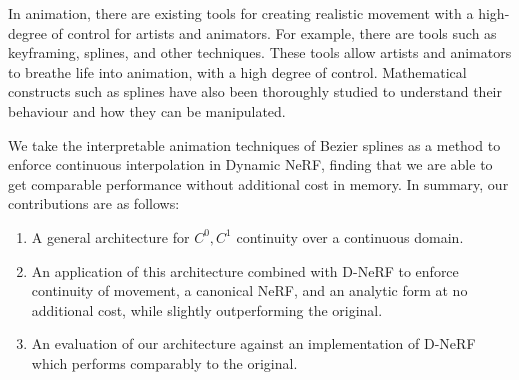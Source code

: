 In animation, there are existing tools for creating realistic movement with a high-degree of
control for artists and animators. For example, there are tools such as keyframing, splines,
and other techniques. These tools allow artists and animators to breathe life into animation,
with a high degree of control. Mathematical constructs such as splines have also been thoroughly
studied to understand their behaviour and how they can be manipulated.

We take the interpretable animation techniques of Bezier splines as a method to enforce continuous interpolation in Dynamic NeRF, finding that we are able to get comparable performance without additional cost in memory.
In summary, our contributions are as follows:

\begin{enumerate}
    \item A general architecture for $C^0, C^1$ continuity over a continuous domain.
    \item An application of this architecture combined with D-NeRF to enforce continuity of movement, a canonical NeRF, and an analytic form at no additional cost, while slightly outperforming the original.
    \item An evaluation of our architecture against an implementation of D-NeRF which performs comparably to the original.
\end{enumerate}
